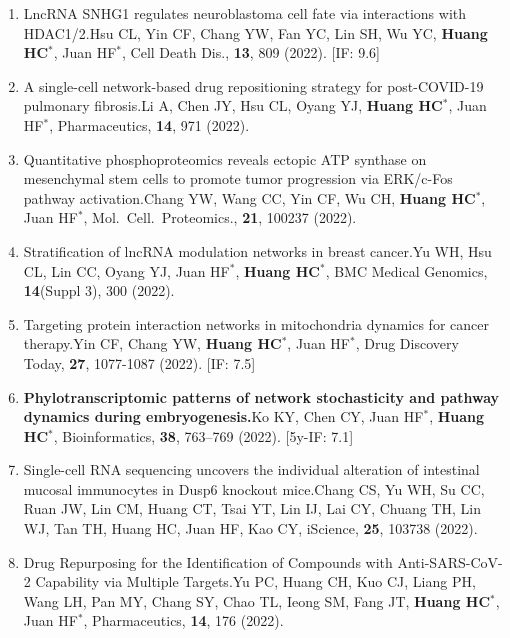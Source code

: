 \documentclass[10pt,a4paper]{article}
\def\mypub#1#2#3{{#1.}\newline #2, #3.}
\def\mybpub#1#2#3{{\boldmath \bf #1.}\newline #2, #3.}
\begin{document}
\begin{enumerate}
\item
\mypub{LncRNA SNHG1 regulates neuroblastoma cell fate via interactions with HDAC1/2}
{Hsu CL, Yin CF, Chang YW, Fan YC, Lin SH, Wu YC, {\bf Huang HC$^*$}, Juan HF$^*$}
{Cell Death Dis., {\bf 13}, 809 (2022)}
[IF: 9.6]

\item
\mypub{A single-cell network-based drug repositioning strategy for post-COVID-19 pulmonary fibrosis}
{Li A, Chen JY, Hsu CL, Oyang YJ, {\bf Huang HC$^*$}, Juan HF$^*$}
{Pharmaceutics, {\bf 14}, 971 (2022)}

\item
\mypub{Quantitative phosphoproteomics reveals ectopic ATP synthase on mesenchymal stem cells to promote tumor progression via ERK/c-Fos pathway activation}
{Chang YW, Wang CC, Yin CF, Wu CH, {\bf Huang HC$^*$}, Juan HF$^*$}
{Mol.\ Cell.\ Proteomics., {\bf 21}, 100237 (2022)}

\item
\mypub{Stratification of lncRNA modulation networks in breast cancer}
{Yu WH, Hsu CL, Lin CC, Oyang YJ, Juan HF$^*$, {\bf Huang HC$^*$}}
{BMC Medical Genomics, {\bf 14}(Suppl 3), 300 (2022)}

\item
\mypub{Targeting protein interaction networks in mitochondria dynamics for cancer therapy}
{Yin CF, Chang YW, {\bf Huang HC$^*$}, Juan HF$^*$}
{Drug Discovery Today, {\bf 27}, 1077-1087 (2022)}
[IF: 7.5]

\item
\mybpub{Phylotranscriptomic patterns of network stochasticity and pathway dynamics during embryogenesis}
{Ko KY, Chen CY, Juan HF$^*$, {\bf Huang HC$^*$}}
{Bioinformatics, {\bf 38}, 763–769 (2022)}
[5y-IF: 7.1]

\item
\mypub{Single-cell RNA sequencing uncovers the individual alteration of intestinal mucosal immunocytes in Dusp6 knockout mice}
{Chang CS, Yu WH, Su CC, Ruan JW, Lin CM, Huang CT, Tsai YT, Lin IJ, Lai CY, Chuang TH, Lin WJ, Tan TH, Huang HC, Juan HF, Kao CY}
{iScience, {\bf 25}, 103738 (2022)}

\item
\mypub{Drug Repurposing for the Identification of Compounds with Anti-SARS-CoV-2 Capability via Multiple Targets}
{Yu PC, Huang CH, Kuo CJ, Liang PH, Wang LH, Pan MY, Chang SY, Chao TL, Ieong SM, Fang JT, {\bf Huang HC$^*$}, Juan HF$^*$}
{Pharmaceutics, {\bf 14}, 176 (2022)}


\end{enumerate}
\end{document}
